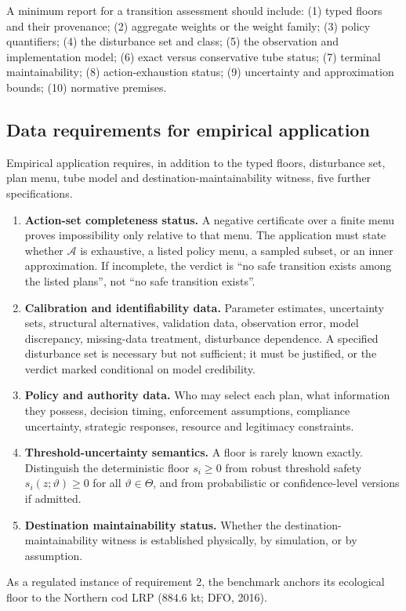 A minimum report for a transition assessment should include: (1) typed floors and their provenance; (2) aggregate weights or the weight family; (3) policy quantifiers; (4) the disturbance set and class; (5) the observation and implementation model; (6) exact versus conservative tube status; (7) terminal maintainability; (8) action-exhaustion status; (9) uncertainty and approximation bounds; (10) normative premises.

\subsection{Data requirements for empirical application}

Empirical application requires, in addition to the typed floors, disturbance set, plan menu, tube model and destination-maintainability witness, five further specifications.
\begin{enumerate}[leftmargin=2em]
\item \textbf{Action-set completeness status.} A negative certificate over a finite menu proves impossibility only relative to that menu. The application must state whether $\mathcal A$ is exhaustive, a listed policy menu, a sampled subset, or an inner approximation. If incomplete, the verdict is ``no safe transition exists among the listed plans'', not ``no safe transition exists''.
\item \textbf{Calibration and identifiability data.} Parameter estimates, uncertainty sets, structural alternatives, validation data, observation error, model discrepancy, missing-data treatment, disturbance dependence. A specified disturbance set is necessary but not sufficient; it must be justified, or the verdict marked conditional on model credibility.
\item \textbf{Policy and authority data.} Who may select each plan, what information they possess, decision timing, enforcement assumptions, compliance uncertainty, strategic responses, resource and legitimacy constraints.
\item \textbf{Threshold-uncertainty semantics.} A floor is rarely known exactly. Distinguish the deterministic floor $s_i\ge0$ from robust threshold safety $s_i(z;\vartheta)\ge0$ for all $\vartheta\in\Theta$, and from probabilistic or confidence-level versions if admitted.
\item \textbf{Destination maintainability status.} Whether the destination-maintainability witness is established physically, by simulation, or by assumption.
\end{enumerate}
As a regulated instance of requirement 2, the benchmark anchors its ecological floor to the Northern cod LRP ($884.6$ kt; DFO, 2016).

